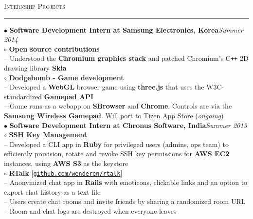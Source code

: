 \documentclass[a4paper,9pt]{article}
\begin{document}
\Large{\textsc{Internship Projects}}\vspace{1.5pt}
\hrule\vspace{0.25cm}
\small
$\bullet$ \textbf{Software Development Intern at Samsung Electronics, Korea}\hfill \textit{Summer 2014}\\
$\circ$ \textbf{Open source contributions}\\
-- Understood the \textbf{Chromium graphics stack} and patched Chromium's C\verb!++! 2D drawing library \textbf{Skia}\\
$\circ$ \textbf{Dodgebomb - Game development}\\
-- Developed a \textbf{WebGL} browser game using \textbf{three.js} that uses the W3C-standardized \textbf{Gamepad API}\\
-- Game runs as a webapp on \textbf{SBrowser} and \textbf{Chrome}. Controls are via the \textbf{Samsung Wireless Gamepad}. Will port to Tizen App Store (\textit{ongoing})\\
$\bullet$ \textbf{Software Development Intern at Chronus Software, India}\hfill \textit{Summer 2013}\\
$\circ$ \textbf{SSH Key Management}\\
-- Developed a CLI app in \textbf{Ruby} for privileged users (admins, ops team) to efficiently provision, rotate and revoke SSH key permissions for \textbf{AWS EC2} instances, using \textbf{AWS S3} as the keystore\\
$\circ$ \textbf{RTalk} [\href{https://github.com/wenderen/rtalk}{\texttt{github.com/wenderen/rtalk}}]\\
-- Anonymized chat app in \textbf{Rails} with emoticons, clickable links and an option to export chat history as a text file\\
-- Users create chat rooms and invite friends by sharing a randomized room URL\\
-- Room and chat logs are destroyed when everyone leaves\\
\end{document}

